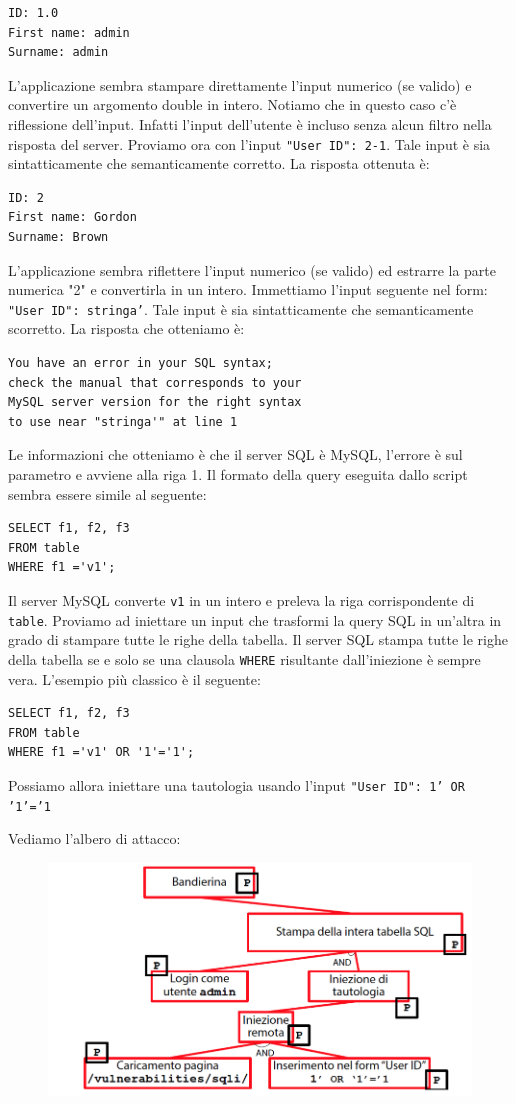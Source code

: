\begin{lstlisting}
ID: 1.0
First name: admin
Surname: admin
\end{lstlisting}

L'applicazione sembra stampare direttamente l'input numerico (se valido) e convertire un argomento double in intero. Notiamo che in questo caso c'è riflessione dell'input. Infatti l'input dell'utente è incluso senza alcun filtro nella risposta del server. Proviamo ora con l'input \texttt{"User ID": 2-1}. Tale input è sia sintatticamente che semanticamente corretto. La risposta ottenuta è:

\begin{lstlisting}
ID: 2
First name: Gordon
Surname: Brown
\end{lstlisting}

L'applicazione sembra riflettere l'input numerico (se valido) ed estrarre la parte numerica "2" e convertirla in un intero. Immettiamo l'input seguente nel form: \texttt{"User ID": stringa'}. Tale input è sia sintatticamente che semanticamente scorretto. La risposta che otteniamo è:
\begin{lstlisting}
You have an error in your SQL syntax;
check the manual that corresponds to your
MySQL server version for the right syntax
to use near "stringa'" at line 1
\end{lstlisting}
Le informazioni che otteniamo è che il server SQL è MySQL, l'errore è sul parametro e avviene alla riga 1. Il formato della query eseguita dallo script sembra essere simile al seguente:
\begin{lstlisting}
SELECT f1, f2, f3
FROM table
WHERE f1 ='v1';
\end{lstlisting}

Il server MySQL converte \texttt{v1} in un intero e preleva la riga corrispondente di \texttt{table}. Proviamo ad iniettare un input che trasformi la query SQL in un'altra in grado di stampare tutte le righe della tabella. Il server SQL stampa tutte le righe della tabella se e solo se una clausola \texttt{WHERE} risultante dall'iniezione è sempre vera. L'esempio più classico è il seguente:
\begin{lstlisting}
SELECT f1, f2, f3
FROM table
WHERE f1 ='v1' OR '1'='1';
\end{lstlisting}
Possiamo allora iniettare una tautologia usando l'input \texttt{"User ID": 1' OR '1'='1}

Vediamo l'albero di attacco:

\begin{figure}[hbpt!]
    \centering
    \includegraphics[width= 0.8 \textwidth]{./Images/cap6/6.3.png}
\end{figure}
\FloatBarrier

